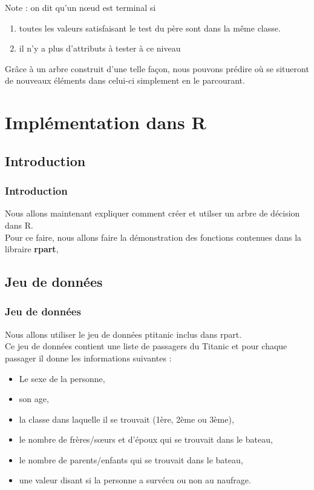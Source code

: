 \documentclass[compress]{beamer}
\begin{document}
\begin{frame}
Note : on dit qu'un nœud est terminal si 
\begin{enumerate}
\item toutes les valeurs satisfaisant le test du père sont dans la même classe.
\item il n'y a plus d'attributs à tester à ce niveau
\end{enumerate}

Grâce à un arbre construit d'une telle façon, nous pouvons prédire où se situeront de nouveaux éléments dans celui-ci simplement en le parcourant.
\end{frame}

\section{Implémentation dans R}
\subsection{Introduction}
\begin{frame}
\frametitle{Introduction}
Nous allons maintenant expliquer comment créer et utilser un arbre de décision dans R.\\
Pour ce faire, nous allons faire la démonstration des fonctions contenues dans la libraire \textbf{rpart}, 
\end{frame}
\subsection{Jeu de données}
\begin{frame}
\frametitle{Jeu de données}
Nous allons utiliser le jeu de données \textrm{ptitanic} inclus dans \textrm{rpart}.\\
Ce jeu de données contient une liste de passagers du Titanic et pour chaque passager il donne les informations suivantes :\newline
\begin{itemize}
 \item Le sexe de la personne,
 \item son age,
 \item la classe dans laquelle il se trouvait (1ère, 2ème ou 3ème),
 \item le nombre de frères/sœurs et d'époux qui se trouvait dans le bateau,
 \item le nombre de parents/enfants qui se trouvait dans le bateau,
 \item une valeur disant si la personne a survécu ou non au naufrage.
\end{itemize}
\end{frame}
\end{document}

